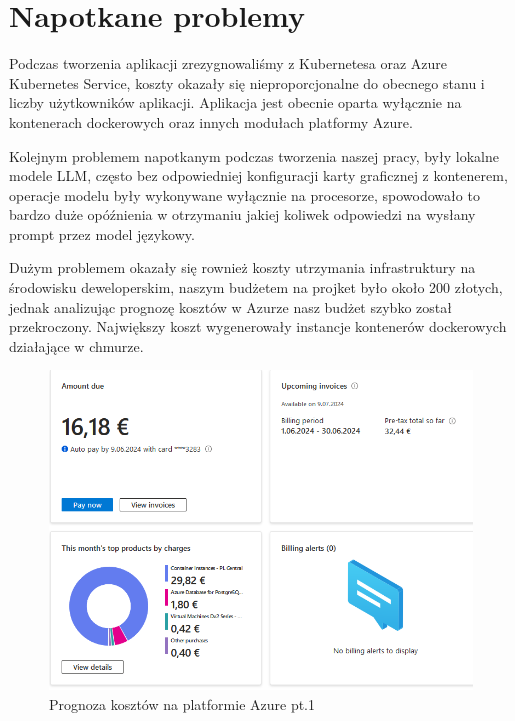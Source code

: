 \section{Napotkane problemy}
Podczas tworzenia aplikacji zrezygnowaliśmy z Kubernetesa oraz Azure Kubernetes Service, koszty okazały się nieproporcjonalne do obecnego stanu i liczby użytkowników aplikacji. Aplikacja jest obecnie oparta wyłącznie na kontenerach dockerowych oraz innych modułach platformy Azure.

Kolejnym problemem napotkanym podczas tworzenia naszej pracy, były lokalne modele LLM, często bez odpowiedniej konfiguracji karty graficznej z kontenerem, operacje modelu były wykonywane wyłącznie na procesorze, spowodowało to bardzo duże opóźnienia w otrzymaniu jakiej koliwek odpowiedzi na wysłany prompt przez model językowy.

Dużym problemem okazały się rownież koszty utrzymania infrastruktury na środowisku deweloperskim, naszym budżetem na projket było około 200 złotych, jednak analizując prognozę kosztów w Azurze nasz budżet szybko został przekroczony. Największy koszt wygenerowały instancje kontenerów dockerowych działające w chmurze. 

\begin{figure}[h]
    \centering
    \includegraphics[width=1\textwidth]{Obrazy/costs/costs_1.png}
    \caption{Prognoza kosztów na platformie Azure pt.1}
    \label{fig:my_label}
\end{figure}

